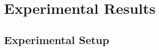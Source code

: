 %
%
%
%
%
%

\section{Experimental Results}
\label{sec:results}

\subsection{Experimental Setup}
\label{sec:results:setup}

